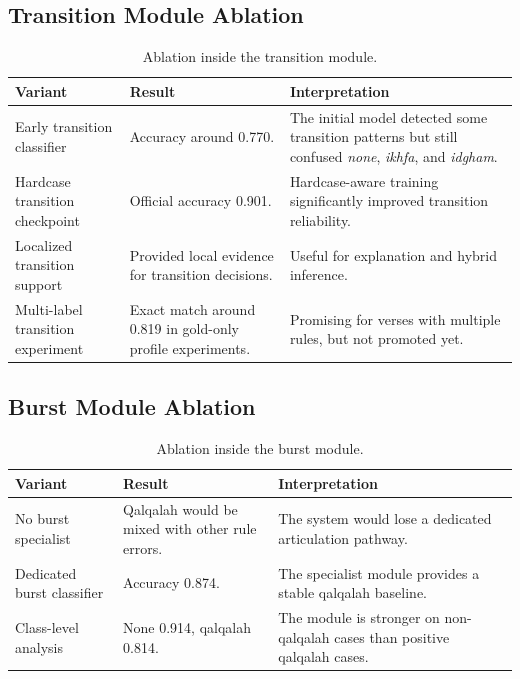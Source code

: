 \documentclass[12pt,a4paper]{report}
\begin{document}
\subsection{Transition Module Ablation}

\begin{table}[H]
\centering
\small
\begin{tabularx}{\textwidth}{p{} p{} X}
\toprule
\textbf{Variant} & \textbf{Result} & \textbf{Interpretation} \\
\midrule
Early transition classifier &
Accuracy around 0.770. &
The initial model detected some transition patterns but still confused
\textit{none}, \textit{ikhfa}, and \textit{idgham}. \\
\midrule
Hardcase transition checkpoint &
Official accuracy 0.901. &
Hardcase-aware training significantly improved transition reliability. \\
\midrule
Localized transition support &
Provided local evidence for transition decisions. &
Useful for explanation and hybrid inference. \\
\midrule
Multi-label transition experiment &
Exact match around 0.819 in gold-only profile experiments. &
Promising for verses with multiple rules, but not promoted yet. \\
\bottomrule
\end{tabularx}
\caption{Ablation inside the transition module.}
\label{tab:transition_ablation}
\end{table}

\subsection{Burst Module Ablation}

\begin{table}[H]
\centering
\small
\begin{tabularx}{\textwidth}{p{} p{} X}
\toprule
\textbf{Variant} & \textbf{Result} & \textbf{Interpretation} \\
\midrule
No burst specialist &
Qalqalah would be mixed with other rule errors. &
The system would lose a dedicated articulation pathway. \\
\midrule
Dedicated burst classifier &
Accuracy 0.874. &
The specialist module provides a stable qalqalah baseline. \\
\midrule
Class-level analysis &
None 0.914, qalqalah 0.814. &
The module is stronger on non-qalqalah cases than positive qalqalah cases. \\
\bottomrule
\end{tabularx}
\caption{Ablation inside the burst module.}
\label{tab:burst_ablation}
\end{table}
\end{document}
